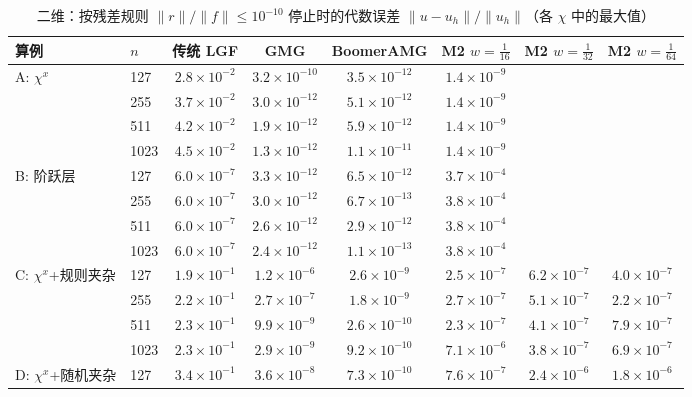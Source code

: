 \begin{table}[H]\centering\small
\caption{二维：按残差规则 $\|r\|/\|f\|\le10^{-10}$ 停止时的代数误差 $\|u-u_h\|/\|u_h\|$（各 $\chi$ 中的最大值）}\label{tab:err2d}
\begin{adjustbox}{max width=\textwidth}
\begin{tabular}{llcccccc}
\toprule
算例 & $n$ & 传统 LGF & GMG & BoomerAMG & M2 $w{=}\frac1{16}$ & M2 $w{=}\frac1{32}$ & M2 $w{=}\frac1{64}$ \\
\midrule
A: $\chi^x$ & 127 & $2.8{\times}10^{-2}$ & $3.2{\times}10^{-10}$ & $3.5{\times}10^{-12}$ & $1.4{\times}10^{-9}$ &  &  \\
 & 255 & $3.7{\times}10^{-2}$ & $3.0{\times}10^{-12}$ & $5.1{\times}10^{-12}$ & $1.4{\times}10^{-9}$ &  &  \\
 & 511 & $4.2{\times}10^{-2}$ & $1.9{\times}10^{-12}$ & $5.9{\times}10^{-12}$ & $1.4{\times}10^{-9}$ &  &  \\
 & 1023 & $4.5{\times}10^{-2}$ & $1.3{\times}10^{-12}$ & $1.1{\times}10^{-11}$ & $1.4{\times}10^{-9}$ &  &  \\
\midrule
B: 阶跃层 & 127 & $6.0{\times}10^{-7}$ & $3.3{\times}10^{-12}$ & $6.5{\times}10^{-12}$ & $3.7{\times}10^{-4}$ &  &  \\
 & 255 & $6.0{\times}10^{-7}$ & $3.0{\times}10^{-12}$ & $6.7{\times}10^{-13}$ & $3.8{\times}10^{-4}$ &  &  \\
 & 511 & $6.0{\times}10^{-7}$ & $2.6{\times}10^{-12}$ & $2.9{\times}10^{-12}$ & $3.8{\times}10^{-4}$ &  &  \\
 & 1023 & $6.0{\times}10^{-7}$ & $2.4{\times}10^{-12}$ & $1.1{\times}10^{-13}$ & $3.8{\times}10^{-4}$ &  &  \\
\midrule
C: $\chi^x$+规则夹杂 & 127 & $1.9{\times}10^{-1}$ & $1.2{\times}10^{-6}$ & $2.6{\times}10^{-9}$ & $2.5{\times}10^{-7}$ & $6.2{\times}10^{-7}$ & $4.0{\times}10^{-7}$ \\
 & 255 & $2.2{\times}10^{-1}$ & $2.7{\times}10^{-7}$ & $1.8{\times}10^{-9}$ & $2.7{\times}10^{-7}$ & $5.1{\times}10^{-7}$ & $2.2{\times}10^{-7}$ \\
 & 511 & $2.3{\times}10^{-1}$ & $9.9{\times}10^{-9}$ & $2.6{\times}10^{-10}$ & $2.3{\times}10^{-7}$ & $4.1{\times}10^{-7}$ & $7.9{\times}10^{-7}$ \\
 & 1023 & $2.3{\times}10^{-1}$ & $2.9{\times}10^{-9}$ & $9.2{\times}10^{-10}$ & $7.1{\times}10^{-6}$ & $3.8{\times}10^{-7}$ & $6.9{\times}10^{-7}$ \\
\midrule
D: $\chi^x$+随机夹杂 & 127 & $3.4{\times}10^{-1}$ & $3.6{\times}10^{-8}$ & $7.3{\times}10^{-10}$ & $7.6{\times}10^{-7}$ & $2.4{\times}10^{-6}$ & $1.8{\times}10^{-6}$ \\

\end{tabular}
\end{adjustbox}
\end{table}
